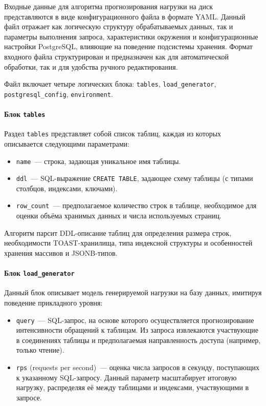 Входные данные для алгоритма прогнозирования нагрузки на диск представляются в виде конфигурационного файла в формате YAML. Данный файл отражает как логическую структуру обрабатываемых данных, так и параметры выполнения запроса, характеристики окружения и конфигурационные настройки PostgreSQL, влияющие на поведение подсистемы хранения. Формат входного файла структурирован и предназначен как для автоматической обработки, так и для удобства ручного редактирования.

Файл включает четыре логических блока: \texttt{tables}, \texttt{load\_generator}, \texttt{postgresql\_config}, \texttt{environment}.

\paragraph{Блок \texttt{tables}}

Раздел \texttt{tables} представляет собой список таблиц, каждая из которых описывается следующими параметрами:

\begin{itemize}
  \item \texttt{name}~--- строка, задающая уникальное имя таблицы.
  \item \texttt{ddl}~--- SQL-выражение \texttt{CREATE TABLE}, задающее схему таблицы (с типами столбцов, индексами, ключами).
  \item \texttt{row\_count}~--- предполагаемое количество строк в таблице, необходимое для оценки объёма хранимых данных и числа используемых страниц.
\end{itemize}

Алгоритм парсит DDL-описание таблиц для определения размера строк, необходимости TOAST-хранилища, типа индексной структуры и особенностей хранения массивов и JSONB-типов.

\paragraph{Блок \texttt{load\_generator}}

Данный блок описывает модель генерируемой нагрузки на базу данных, имитируя поведение прикладного уровня:

\begin{itemize}
  \item \texttt{query}~--- SQL-запрос, на основе которого осуществляется прогнозирование интенсивности обращений к таблицам. Из запроса извлекаются участвующие в соединениях таблицы и предполагаемая направленность доступа (например, только чтение).
  \item \texttt{rps} (requests per second)~--- оценка числа запросов в секунду, поступающих к указанному SQL-запросу. Данный параметр масштабирует итоговую нагрузку, распределяя её между таблицами и индексами, участвующими в запросе.
\end{itemize}

